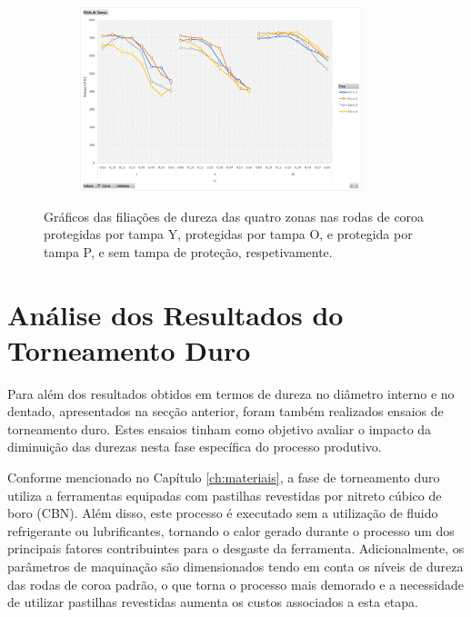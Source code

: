 \begin{figure}[htb]
\begin{subfigure}{.4\textwidth}
        \caption{}
        \label{fig:resultados_Tampa_P_dent}
    \end{subfigure}%
    \begin{subfigure}{.4\textwidth}
        \centering
        \includegraphics[width = 0.9\textwidth]{Figures/Cap4/Grafico_4_Zonas_ST.png}
        \caption{}
        \label{fig:resultados_ST_dent}
    \end{subfigure}
    \caption[Filiações de dureza das quatro zonas na roda de coroa DB45 Nº 1]%
    {Gráficos das filiações de dureza das quatro zonas nas rodas de coroa protegidas por tampa Y, protegidas por tampa O, e protegida por tampa P, e sem tampa de proteção, respetivamente.}
    \label{fig:resultados_4T_dent}
\end{figure}
\section{Análise dos Resultados do Torneamento Duro} \label{sec:resultados_torneamento}
Para além dos resultados obtidos em termos de dureza no diâmetro interno e no dentado, apresentados na secção anterior, foram também realizados ensaios de torneamento duro. Estes ensaios tinham como objetivo avaliar o impacto da diminuição das durezas nesta fase específica do processo produtivo.

\par
Conforme mencionado no Capítulo \ref{ch:materiais}, a fase de torneamento duro utiliza a ferramentas equipadas com pastilhas revestidas por nitreto cúbico de boro (CBN). Além disso, este processo é executado sem a utilização de fluido refrigerante ou lubrificantes, tornando o calor gerado durante o processo um dos principais fatores contribuintes para o desgaste da ferramenta. Adicionalmente, os parâmetros de maquinação são dimensionados tendo em conta os níveis de dureza das rodas de coroa padrão, o que torna o processo mais demorado e a necessidade de utilizar pastilhas revestidas aumenta os custos associados a esta etapa.

